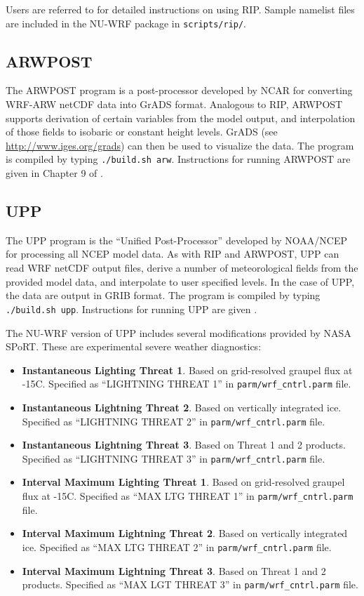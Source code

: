 Users are referred to \cite{ref:RipUserGuide} for detailed instructions on
using RIP. Sample namelist files are included in the NU-WRF package in
\texttt{scripts/rip/}.

\subsection{ARWPOST}

The ARWPOST program is a post-processor developed by NCAR for converting
WRF-ARW netCDF data into GrADS format. Analogous to RIP, ARWPOST supports
derivation of certain variables from the model output, and interpolation
of those fields to isobaric or constant height levels. GrADS
(see \url{http://www.iges.org/grads}) can then be used to visualize the data.
The program is compiled by typing \texttt{./build.sh arw}. Instructions for
running ARWPOST are given in Chapter 9 of \cite{ref:ArwUserGuide}.

\subsection{UPP}
\label{subsec:UPP}

The UPP program is the ``Unified Post-Processor'' developed by NOAA/NCEP
for processing all NCEP model data. As with RIP and ARWPOST,
UPP can read WRF netCDF output files, derive a number of meteorological fields
from the provided model data, and interpolate to user specified levels.
In the case of UPP, the data are output in GRIB format. The program is
compiled by typing \texttt{./build.sh upp}. Instructions for running UPP are 
given \cite{ref:UppUserGuide}.

The NU-WRF version of UPP includes several modifications provided by 
NASA SPoRT. These are experimental severe weather diagnostics: 
\begin{itemize}
\item \textbf{Instantaneous Lighting Threat 1}. Based on grid-resolved
graupel flux at -15C. Specified as ``LIGHTNING THREAT 1'' in 
\texttt{parm/wrf\_cntrl.parm} file.
\item \textbf{Instantaneous Lightning Threat 2}. Based on vertically
integrated ice. Specified as ``LIGHTNING THREAT 2'' in 
\texttt{parm/wrf\_cntrl.parm} file.
\item \textbf{Instantaneous Lightning Threat 3}. Based on Threat 1 and 2 
products. Specified as ``LIGHTNING THREAT 3'' in 
\texttt{parm/wrf\_cntrl.parm} file.
\item \textbf{Interval Maximum Lighting Threat 1}. Based on grid-resolved
graupel flux at -15C. Specified as ``MAX LTG THREAT 1'' in 
\texttt{parm/wrf\_cntrl.parm} file.
\item \textbf{Interval Maximum Lightning Threat 2}. Based on vertically
integrated ice. Specified as ``MAX LTG THREAT 2'' in 
\texttt{parm/wrf\_cntrl.parm} file.
\item \textbf{Interval Maximum Lightning Threat 3}. Based on Threat 1 and 2 
products. Specified as ``MAX LGT THREAT 3'' in  
\texttt{parm/wrf\_cntrl.parm} file.
\end{itemize}

